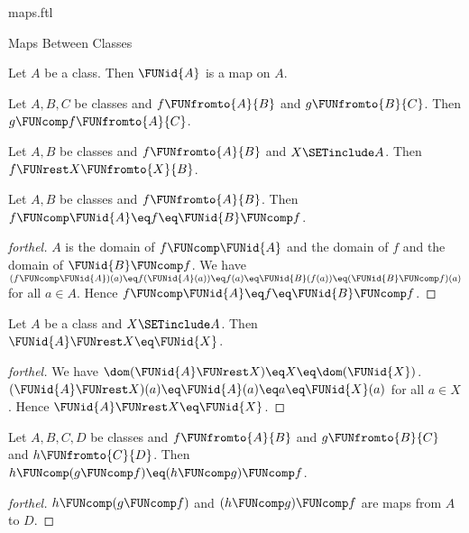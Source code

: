 \documentclass{naproche-library}
\begin{document}
\begin{smodule}[title=Maps]{maps.ftl}
\begin{sfragment}{Maps Between Classes}
  \begin{proposition}[forthel,id=FOUNDATIONS_06_5104361690628096]
    Let $A$ be a class.
    Then $\FUNid{A}$ is a map on $A$.
  \end{proposition}

  \begin{proposition}[forthel,id=FOUNDATIONS_06_1706446651654144]
    Let $A, B, C$ be classes and $f \FUNfromto{A}{B}$ and $g \FUNfromto{B}{C}$.
    Then $g \FUNcomp f \FUNfromto{A}{C}$.
  \end{proposition}

  \begin{proposition}[forthel,id=FOUNDATIONS_06_4078561256275968]
    Let $A, B$ be classes and $f \FUNfromto{A}{B}$ and $X \SETinclude A$.
    Then $f \FUNrest X \FUNfromto{X}{B}$.
  \end{proposition}

  \begin{proposition}[forthel,id=FOUNDATIONS_06_3964401904254976]
    Let $A, B$ be classes and $f \FUNfromto{A}{B}$.
    Then $f \FUNcomp \FUNid{A} \eq f \eq \FUNid{B} \FUNcomp f$.
  \end{proposition}
  \begin{proof}[forthel]
    $A$ is the domain of $f \FUNcomp \FUNid{A}$ and the domain of $f$ and the domain of $\FUNid{B} \FUNcomp f$.
    We have $(f \FUNcomp \FUNid{A})(a)
      \eq f(\FUNid{A}(a))
      \eq f(a)
      \eq \FUNid{B}(f(a))
      \eq (\FUNid{B} \FUNcomp f)(a)$
    for all $a \in A$.
    Hence $f \FUNcomp \FUNid{A}
      \eq f
      \eq \FUNid{B} \FUNcomp f$.
  \end{proof}

  \begin{proposition}[forthel,id=FOUNDATIONS_06_3118771061391360]
    Let $A$ be a class and $X \SETinclude A$.
    Then $\FUNid{A} \FUNrest X \eq \FUNid{X}$.
  \end{proposition}
  \begin{proof}[forthel]
    We have $\dom(\FUNid{A} \FUNrest X)
      \eq X
      \eq \dom(\FUNid{X})$.
    $(\FUNid{A} \FUNrest X)(a)
      \eq \FUNid{A}(a)
      \eq a
      \eq \FUNid{X}(a)$
    for all $a \in X$.
    Hence $\FUNid{A} \FUNrest X \eq \FUNid{X}$.
  \end{proof}

  \begin{proposition}[forthel,id=FOUNDATIONS_06_6866147389472768]
    Let $A, B, C, D$ be classes and $f \FUNfromto{A}{B}$ and $g \FUNfromto{B}{C}$ and $h \FUNfromto{C}{D}$.
    Then $h \FUNcomp (g \FUNcomp f) \eq (h \FUNcomp g) \FUNcomp f$.
  \end{proposition}
  \begin{proof}[forthel]
    $h \FUNcomp (g \FUNcomp f)$ and $(h \FUNcomp g) \FUNcomp f$ are maps from $A$ to $D$.


\end{proof}
\end{sfragment}
\end{smodule}
\end{document}
